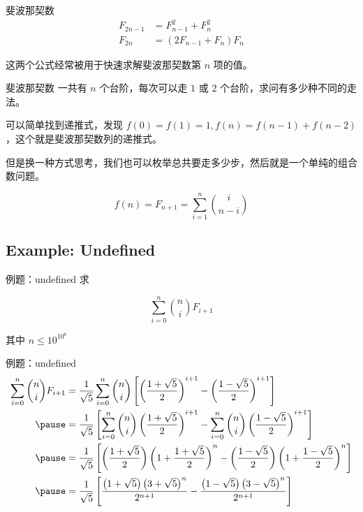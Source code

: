 \documentclass[12pt,aspectratio=169]{beamer}
\begin{document}
\begin{frame}[fragile]{斐波那契数}
  $$
  \begin{aligned}
    F_{2n-1} &= F_{n-1}^2 + F_{n}^2 \\
    F_{2n} &= (2 F_{n-1}+  F_{n}) F_{n}
  \end{aligned}
  $$

  这两个公式经常被用于快速求解斐波那契数第 $n$ 项的值。
\end{frame}

\begin{frame}[fragile]{斐波那契数}
  一共有 $n$ 个台阶，每次可以走 $1$ 或 $2$ 个台阶，求问有多少种不同的走法。\pause

  可以简单找到递推式，发现 $f(0) = f(1) = 1, f(n) = f(n-1) + f(n-2)$，这个就是斐波那契数列的递推式。\pause

  但是换一种方式思考，我们也可以枚举总共要走多少步，然后就是一个单纯的组合数问题。\pause

  $$
  f(n) = F_{n+1} = \sum_{i=1}^{n} {i \choose n-i}
  $$
\end{frame}

\subsection[例题：undefined]{Example: Undefined}

\begin{frame}[fragile]{例题：undefined}
求

$$
\sum_{i=0}^n {n \choose i} F_{i+1}
$$

其中 $n \le 10^{10^6}$
\end{frame}

\begin{frame}[fragile]{例题：undefined}
$$
\begin{aligned}
\sum_{i=0}^n {n \choose i} F_{i+1} &= \frac{1}{\sqrt{5}} \sum_{i=0}^n {n \choose i} \left[\left(\frac{1+\sqrt{5}}{2}\right)^{i+1} - \left(\frac{1-\sqrt{5}}{2}\right)^{i+1}\right] \\ \pause
&= \frac{1}{\sqrt{5}} \left[\sum_{i=0}^n {n \choose i} \left(\frac{1+\sqrt{5}}{2}\right)^{i+1} - \sum_{i=0}^n {n \choose i} \left(\frac{1-\sqrt{5}}{2}\right)^{i+1}\right] \\ \pause
&= \frac{1}{\sqrt{5}} \left[\left(\frac{1+\sqrt{5}}{2}\right)\left(1+\frac{1+\sqrt{5}}{2}\right)^n-\left(\frac{1-\sqrt{5}}{2}\right)\left(1+\frac{1-\sqrt{5}}{2}\right)^n\right] \\ \pause
&= \frac{1}{\sqrt{5}} \left[\frac{\left(1+\sqrt{5}\right)\left(3+\sqrt{5}\right)^n}{2^{n+1}}-\frac{\left(1-\sqrt{5}\right)\left(3-\sqrt{5}\right)^n}{2^{n+1}}\right] \\
\end{aligned}
$$
\end{frame}
\end{document}
